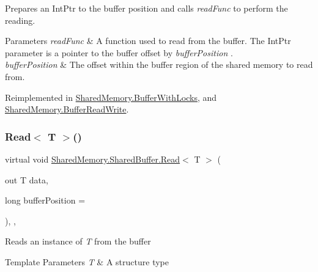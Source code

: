 Prepares an Int\+Ptr to the buffer position and calls {\itshape read\+Func}  to perform the reading. 


\begin{DoxyParams}{Parameters}
{\em read\+Func} & A function used to read from the buffer. The Int\+Ptr parameter is a pointer to the buffer offset by {\itshape buffer\+Position} .\\
\hline
{\em buffer\+Position} & The offset within the buffer region of the shared memory to read from.\\
\hline
\end{DoxyParams}


Reimplemented in \hyperlink{class_shared_memory_1_1_buffer_with_locks_a61d2f003963ccbedaff237c69814104d}{Shared\+Memory.\+Buffer\+With\+Locks}, and \hyperlink{class_shared_memory_1_1_buffer_read_write_ad8e09d6fb5fd4f72170e768f7b84911d}{Shared\+Memory.\+Buffer\+Read\+Write}.

\mbox{\label{class_shared_memory_1_1_shared_buffer_a27d48f6be3b300882aa9aa71339421be}} 
\subsubsection{\texorpdfstring{Read$<$ T $>$()}{Read< T >()}\hspace{0.1cm}{\footnotesize\ttfamily [1/2]}}
{\footnotesize\ttfamily virtual void \hyperlink{class_shared_memory_1_1_shared_buffer_a95407dfdc38af1afeeb9a9c4a8569982}{Shared\+Memory.\+Shared\+Buffer.\+Read}$<$ T $>$ (\begin{DoxyParamCaption}\item[{out T}]{data,  }\item[{long}]{buffer\+Position = {} }\end{DoxyParamCaption})\hspace{0.3cm}{\ttfamily [inline]}, {\ttfamily [protected]}, {\ttfamily [virtual]}}



Reads an instance of {\itshape T}  from the buffer 


\begin{DoxyTemplParams}{Template Parameters}
{\em T} & A structure type\\
\hline
\end{DoxyTemplParams}

